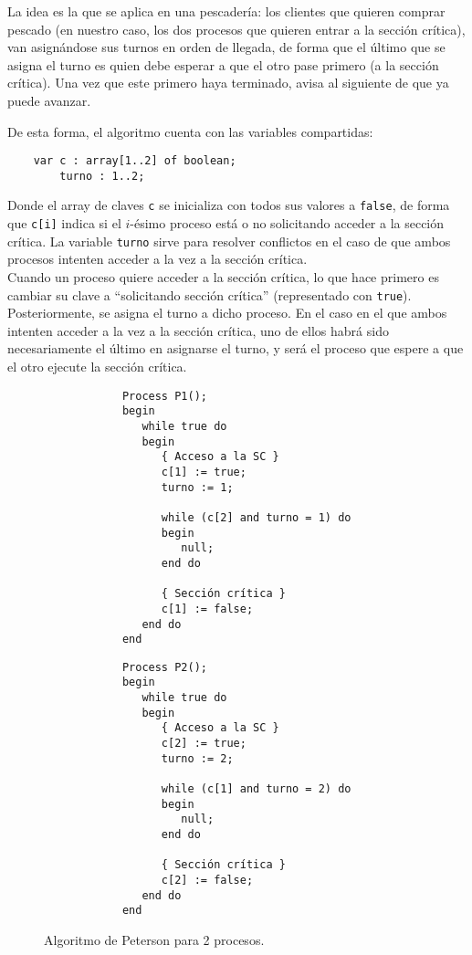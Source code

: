 La idea es la que se aplica en una pescadería: los clientes que quieren comprar pescado (en nuestro caso, los dos procesos que quieren entrar a la sección crítica), van asignándose sus turnos en orden de llegada, de forma que el último que se asigna el turno es quien debe esperar a que el otro pase primero (a la sección crítica). Una vez que este primero haya terminado, avisa al siguiente de que ya puede avanzar.

De esta forma, el algoritmo cuenta con las variables compartidas:
\begin{verbatim}
    var c : array[1..2] of boolean;
        turno : 1..2;
\end{verbatim}
Donde el array de claves \verb|c| se inicializa con todos sus valores a \verb|false|, de forma que \verb|c[i]| indica si el $i$-ésimo proceso está o no solicitando acceder a la sección crítica. La variable \verb|turno| sirve para resolver conflictos en el caso de que ambos procesos intenten acceder a la vez a la sección crítica.\\

Cuando un proceso quiere acceder a la sección crítica, lo que hace primero es cambiar su clave a ``solicitando sección crítica'' (representado con \verb|true|). Posteriormente, se asigna el turno a dicho proceso. En el caso en el que ambos intenten acceder a la vez a la sección crítica, uno de ellos habrá sido necesariamente el último en asignarse el turno, y será el proceso que espere a que el otro ejecute la sección crítica.

\begin{figure}[H]
    \centering
    \setlength{\columnsep}{1cm}
    \begin{multicols}{2}
        \begin{verbatim}
            Process P1();
            begin
               while true do
               begin
                  { Acceso a la SC }
                  c[1] := true;
                  turno := 1;

                  while (c[2] and turno = 1) do
                  begin
                     null;
                  end do

                  { Sección crítica }
                  c[1] := false;
               end do
            end
        \end{verbatim}
        \begin{verbatim}
            Process P2();
            begin
               while true do
               begin
                  { Acceso a la SC }
                  c[2] := true;
                  turno := 2;

                  while (c[1] and turno = 2) do
                  begin
                     null;
                  end do

                  { Sección crítica }
                  c[2] := false;
               end do
            end
        \end{verbatim}
    \end{multicols}
    \caption{Algoritmo de Peterson para 2 procesos.}
\end{figure}

